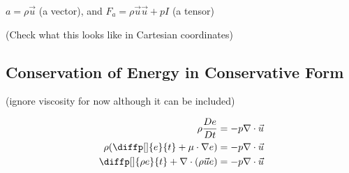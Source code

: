$a = \rho \vec{u}$ (a vector), and $F_a = \rho \vec{u} \vec{u} + pI$ (a tensor)

(Check what this looks like in Cartesian coordinates)

\subsection{Conservation of Energy in Conservative Form}%

(ignore viscosity for now although it can be included)

\begin{align*}
  \rho \frac{De}{Dt} &= -p\nabla\cdot \vec{u} \\
  \rho (\diffp[]{e}{t}+ \mu\cdot\nabla e) &= -p\nabla\cdot \vec{u} \\
  \diffp[]{ \rho e}{t}+\nabla\cdot ( \rho \vec{u} e) &= -p\nabla\cdot \vec{u} \\
\end{align*}

